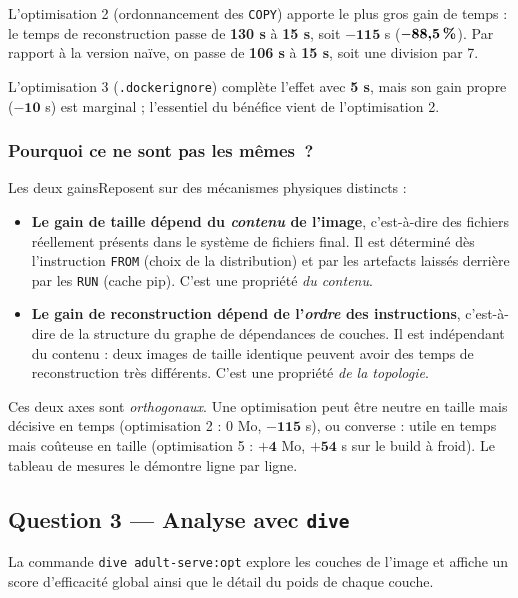 \documentclass[11pt,a4paper]{report}
\newcommand{\num}[1]{\textbf{#1}}
\begin{document}
L'optimisation 2 (ordonnancement des \texttt{COPY}) apporte le plus gros gain
de temps : le temps de reconstruction passe de \num{130 s} à \num{15 s}, soit
$-\num{115}$ s ($-\num{88,5\,\%}$). Par rapport à la version naïve, on passe
de \num{106 s} à \num{15 s}, soit une division par 7.

L'optimisation 3 (\texttt{.dockerignore}) complète l'effet avec \num{5 s}, mais
son gain propre ($-\num{10}$ s) est marginal ; l'essentiel du bénéfice vient
de l'optimisation 2.

\subsubsection{Pourquoi ce ne sont pas les mêmes~?}

Les deux gainsReposent sur des mécanismes physiques distincts :

\begin{itemize}
  \item \textbf{Le gain de taille dépend du \emph{contenu} de l'image}, c'est-à-dire
        des fichiers réellement présents dans le système de fichiers final.
        Il est déterminé dès l'instruction \texttt{FROM} (choix de la
        distribution) et par les artefacts laissés derrière par les
        \texttt{RUN} (cache pip). C'est une propriété \emph{du contenu}.
  \item \textbf{Le gain de reconstruction dépend de l'\emph{ordre} des
        instructions}, c'est-à-dire de la structure du graphe de
        dépendances de couches. Il est indépendant du contenu : deux images
        de taille identique peuvent avoir des temps de reconstruction
        très différents. C'est une propriété \emph{de la topologie}.
\end{itemize}

Ces deux axes sont \emph{orthogonaux}. Une optimisation peut être neutre en
taille mais décisive en temps (optimisation 2 : $0$ Mo, $-\num{115}$ s), ou
converse : utile en temps mais coûteuse en taille (optimisation 5 :
$+\num{4}$ Mo, $+\num{54}$ s sur le build à froid). Le tableau de mesures le
démontre ligne par ligne.

\subsection{Question 3 --- Analyse avec \texttt{dive}}
\label{sec:dive}

La commande \texttt{dive adult-serve:opt} explore les couches de l'image et
affiche un score d'efficacité global ainsi que le détail du poids de chaque
couche.
\end{document}
